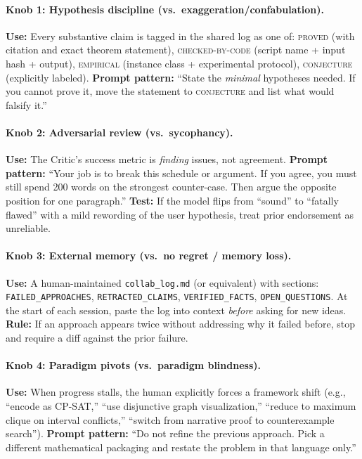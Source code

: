 \documentclass[11pt]{article}
\begin{document}
\paragraph{Knob 1: Hypothesis discipline (vs.\ exaggeration/confabulation).}
\textbf{Use:} Every substantive claim is tagged in the shared log as one of:
\textsc{proved} (with citation and exact theorem statement),
\textsc{checked-by-code} (script name + input hash + output),
\textsc{empirical} (instance class + experimental protocol),
\textsc{conjecture} (explicitly labeled).
\textbf{Prompt pattern:} ``State the \emph{minimal} hypotheses needed. If you cannot prove it, move the statement to \textsc{conjecture} and list what would falsify it.''

\paragraph{Knob 2: Adversarial review (vs.\ sycophancy).}
\textbf{Use:} The Critic's success metric is \emph{finding} issues, not agreement.
\textbf{Prompt pattern:} ``Your job is to break this schedule or argument. If you agree, you must still spend 200 words on the strongest counter-case. Then argue the opposite position for one paragraph.''
\textbf{Test:} If the model flips from ``sound'' to ``fatally flawed'' with a mild rewording of the user hypothesis, treat prior endorsement as unreliable.

\paragraph{Knob 3: External memory (vs.\ no regret / memory loss).}
\textbf{Use:} A human-maintained \texttt{collab\_log.md} (or equivalent) with sections:
\texttt{FAILED\_APPROACHES}, \texttt{RETRACTED\_CLAIMS}, \texttt{VERIFIED\_FACTS}, \texttt{OPEN\_QUESTIONS}.
At the start of each session, paste the log into context \emph{before} asking for new ideas.
\textbf{Rule:} If an approach appears twice without addressing why it failed before, stop and require a diff against the prior failure.

\paragraph{Knob 4: Paradigm pivots (vs.\ paradigm blindness).}
\textbf{Use:} When progress stalls, the human explicitly forces a framework shift (e.g., ``encode as CP-SAT,'' ``use disjunctive graph visualization,'' ``reduce to maximum clique on interval conflicts,'' ``switch from narrative proof to counterexample search'').
\textbf{Prompt pattern:} ``Do not refine the previous approach. Pick a different mathematical packaging and restate the problem in that language only.''
\end{document}
